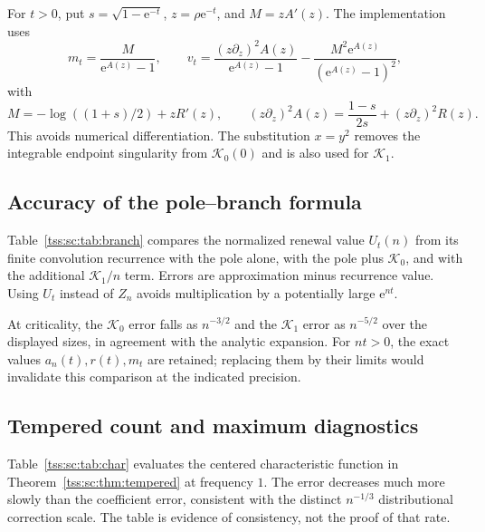 \documentclass[11pt]{article}
\theoremstyle{remark}\newtheorem{remark}[theorem]{Remark}
\theoremstyle{definition}\newtheorem{definition}[theorem]{Definition}
\newcommand{\e}{\mathrm e}
\newcommand{\Kc}{\mathcal K}
\begin{document}
For $t>0$, put $s=\sqrt{1-\e^{-t}}$, $z=\rho\e^{-t}$, and $M=zA'(z)$. The implementation uses
\begin{equation}\label{tss:sc:eq:numericalmt}
 m_t=\frac{M}{\e^{A(z)}-1},\qquad
 v_t=\frac{(z\partial_z)^2A(z)}{\e^{A(z)}-1}
      -\frac{M^2\e^{A(z)}}{(\e^{A(z)}-1)^2},
\end{equation}
with
\[
 M=-\log((1+s)/2)+zR'(z),\qquad
 (z\partial_z)^2A(z)=\frac{1-s}{2s}+(z\partial_z)^2R(z).
\]
This avoids numerical differentiation. The substitution $x=y^2$ removes the integrable endpoint singularity from $\Kc_0(0)$ and is also used for $\Kc_1$.

\subsection{Accuracy of the pole--branch formula}
Table~\ref{tss:sc:tab:branch} compares the normalized renewal value $U_t(n)$ from its finite convolution recurrence with the pole alone, with the pole plus $\Kc_0$, and with the additional $\Kc_1/n$ term. Errors are approximation minus recurrence value. Using $U_t$ instead of $Z_n$ avoids multiplication by a potentially large $\e^{nt}$.

\begin{table}[htbp]\centering\small

\caption{Absolute errors for $U_t(n)$ at the coefficient-coalescence scale. The last column at $nt=4$, $n=4096$ is close enough to floating-point accumulation error that it should not be read as an independently certified remainder.}
\label{tss:sc:tab:branch}
\end{table}

At criticality, the $\Kc_0$ error falls as $n^{-3/2}$ and the $\Kc_1$ error as $n^{-5/2}$ over the displayed sizes, in agreement with the analytic expansion. For $nt>0$, the exact values $a_n(t),r(t),m_t$ are retained; replacing them by their limits would invalidate this comparison at the indicated precision.

\subsection{Tempered count and maximum diagnostics}
Table~\ref{tss:sc:tab:char} evaluates the centered characteristic function in Theorem~\ref{tss:sc:thm:tempered} at frequency $1$. The error decreases much more slowly than the coefficient error, consistent with the distinct $n^{-1/3}$ distributional correction scale. The table is evidence of consistency, not the proof of that rate.
\begin{table}[htbp]\centering\small

\caption{Tempered-window characteristic functions at frequency $1$, with $t=\sigma/b_n$.}
\label{tss:sc:tab:char}
\end{table}
\end{document}
